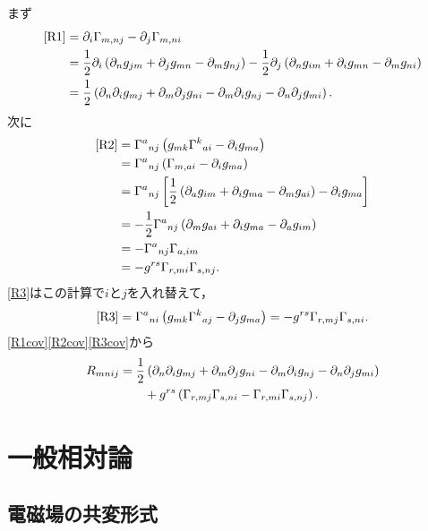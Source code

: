 \documentclass[a4paper]{ltjsreport}
\begin{document}
まず
\begin{align}
  \eqref{R1} &= \partial_i\Gamma_{m, nj} - \partial_j\Gamma_{m, ni}\notag\\
  &= \dfrac{1}{2}\partial_i\left(\partial_ng_{jm} + \partial_jg_{mn} - \partial_mg_{nj}\right) - \dfrac{1}{2}\partial_j\left(\partial_ng_{im} + \partial_ig_{mn} - \partial_mg_{ni}\right)\notag\\
  &= \dfrac{1}{2}\left(\partial_n\partial_ig_{mj} + \partial_m\partial_jg_{ni} - \partial_m\partial_ig_{nj} - \partial_n\partial_jg_{mi}\right).\label{R1cov}
\end{align}
次に
\begin{align}
  \eqref{R2} &= {\Gamma^a}_{nj}\left(g_{mk}{\Gamma^k}_{ai} - \partial_ig_{ma}\right) \\
  &= {\Gamma^a}_{nj}\left(\Gamma_{m, ai} - \partial_ig_{ma}\right)\notag\\
  &= {\Gamma^a}_{nj}\left[\dfrac{1}{2}\left(\partial_ag_{im} + \partial_ig_{ma} - \partial_mg_{ai}\right) - \partial_ig_{ma}\right]\notag\\
  &= -  \dfrac{1}{2}{\Gamma^a}_{nj}\left(\partial_mg_{ai} + \partial_ig_{ma} - \partial_ag_{im}\right)\notag\\
  &= -  {\Gamma^a}_{nj}\Gamma_{a, im}\notag\\
  &= -  g^{rs}\Gamma_{r, mi}\Gamma_{s, nj} . \label{R2cov}
\end{align}
\eqref{R3}はこの計算で$i$と$j$を入れ替えて，
\begin{align}
  \eqref{R3} = {\Gamma^a}_{ni}\left(g_{mk}{\Gamma^k}_{aj} - \partial_jg_{ma}\right)
  = -  g^{rs}\Gamma_{r, mj}\Gamma_{s, ni} . \label{R3cov}
\end{align}
\eqref{R1cov}\eqref{R2cov}\eqref{R3cov}から
\begin{align*}
  R_{mnij} &= \dfrac{1}{2}\left(\partial_n\partial_ig_{mj} + \partial_m\partial_jg_{ni} - \partial_m\partial_ig_{nj} - \partial_n\partial_jg_{mi}\right)\notag\\
  &\qquad + g^{rs}\left(\Gamma_{r, mj}\Gamma_{s, ni} - \Gamma_{r, mi}\Gamma_{s, nj}\right) .
\end{align*}

\chapter{一般相対論}
\setcounter{section}{1}
\section{電磁場の共変形式}
\end{document}
